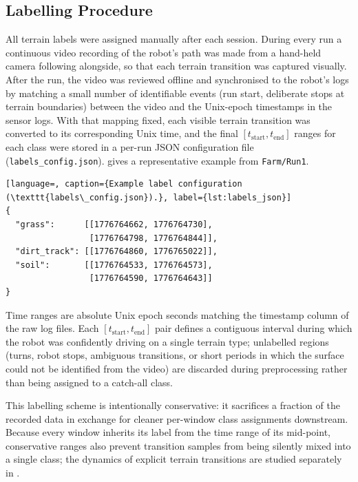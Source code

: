 \subsection{Labelling Procedure}

All terrain labels were assigned manually after each session. During every run a continuous video recording of the robot's path was made from a hand-held camera following alongside, so that each terrain transition was captured visually. After the run, the video was reviewed offline and synchronised to the robot's logs by matching a small number of identifiable events (run start, deliberate stops at terrain boundaries) between the video and the Unix-epoch timestamps in the sensor logs. With that mapping fixed, each visible terrain transition was converted to its corresponding Unix time, and the final $[t_{\text{start}}, t_{\text{end}}]$ ranges for each class were stored in a per-run JSON configuration file (\texttt{labels\_config.json}).  gives a representative example from \texttt{Farm/Run1}.

\begin{lstlisting}[language=, caption={Example label configuration (\texttt{labels\_config.json}).}, label={lst:labels_json}]
{
  "grass":      [[1776764662, 1776764730],
                 [1776764798, 1776764844]],
  "dirt_track": [[1776764860, 1776765022]],
  "soil":       [[1776764533, 1776764573],
                 [1776764590, 1776764643]]
}
\end{lstlisting}

Time ranges are absolute Unix epoch seconds matching the timestamp column of the raw log files. Each $[t_{\text{start}}, t_{\text{end}}]$ pair defines a contiguous interval during which the robot was confidently driving on a single terrain type; unlabelled regions (turns, robot stops, ambiguous transitions, or short periods in which the surface could not be identified from the video) are discarded during preprocessing rather than being assigned to a catch-all class.

This labelling scheme is intentionally conservative: it sacrifices a fraction of the recorded data in exchange for cleaner per-window class assignments downstream. Because every window inherits its label from the time range of its mid-point, conservative ranges also prevent transition samples from being silently mixed into a single class; the dynamics of explicit terrain transitions are studied separately in .